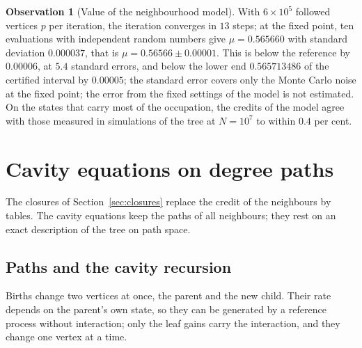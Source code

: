 \documentclass[11pt]{article}
\theoremstyle{plain}
\theoremstyle{definition}
\newtheorem{observation}[theorem]{Observation}
\theoremstyle{remark}
\begin{document}
\begin{observation}[Value of the neighbourhood model]\label{obs:nb}
With $6\times10^5$ followed vertices $p$ per iteration, the iteration converges in $13$ steps; at the fixed point, ten evaluations with independent random numbers give $\mu=0.565660$ with standard deviation $0.000037$, that is $\mu=0.56566\pm0.00001$. This is below the reference by $0.00006$, at $5.4$ standard errors, and below the lower end $0.565713486$ of the certified interval \cite{UzayR3} by $0.00005$; the standard error covers only the Monte Carlo noise at the fixed point; the error from the fixed settings of the model is not estimated. On the states that carry most of the occupation, the credits of the model agree with those measured in simulations of the tree at $N=10^7$ to within $0.4$ per cent.
\end{observation}



\section{Cavity equations on degree paths}\label{sec:cavity}

The closures of Section~\ref{sec:closures} replace the credit of the neighbours by tables. The cavity equations keep the paths of all neighbours; they rest on an exact description of the tree on path space.

\subsection{Paths and the cavity recursion}\label{sec:paths}

Births change two vertices at once, the parent and the new child. Their rate depends on the parent's own state, so they can be generated by a reference process without interaction; only the leaf gains carry the interaction, and they change one vertex at a time.
\end{document}
